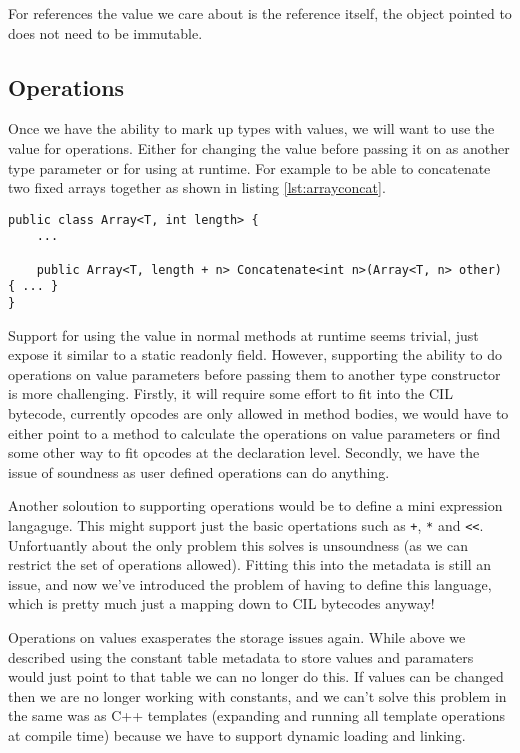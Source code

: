 For references the value we care about is the reference itself, the object pointed to does not need to be immutable.

\subsection{Operations}

Once we have the ability to mark up types with values, we will want
to use the value for operations. Either for changing the value before
passing it on as another type parameter or for using at runtime. 
For example to be able to concatenate two fixed arrays together as shown in listing \ref{lst:arrayconcat}.

\begin{lstlisting}[label={lst:arrayconcat},caption={Concatenate two arrays},keywordstyle={\color{blue}},language=sharpc]
public class Array<T, int length> { 
	...
	
	public Array<T, length + n> Concatenate<int n>(Array<T, n> other) { ... }
}
\end{lstlisting}

Support for using the value in normal methods at runtime seems trivial, just
expose it similar to a static readonly field. However, supporting the
ability to do operations on value parameters before passing them to
another type constructor is more challenging. Firstly, it will require
some effort to fit into the CIL bytecode, currently opcodes are only
allowed in method bodies, we would have to either point to a method
to calculate the operations on value parameters or find some other
way to fit opcodes at the declaration level. Secondly, we have the
issue of soundness as user defined operations can do anything.

Another soloution to supporting operations would be to define a mini expression langaguge. This might 
support just the basic opertations such as \texttt{+}, \texttt{*} and \texttt{<<}. Unfortuantly about
the only problem this solves is unsoundness (as we can restrict the set of operations allowed). Fitting 
this into the metadata is still an issue, and now we've introduced the problem of having to define this 
language, which is pretty much just a mapping down to CIL bytecodes anyway!

Operations on values exasperates the storage issues again. While above we described using the constant table
metadata to store values and paramaters would just point to that table we can no longer do this. If values can be 
changed then we are no longer working with constants, and we can't solve this problem in the same was as C++ templates 
(expanding and running all template operations at compile time) because we have to support dynamic loading and linking.


